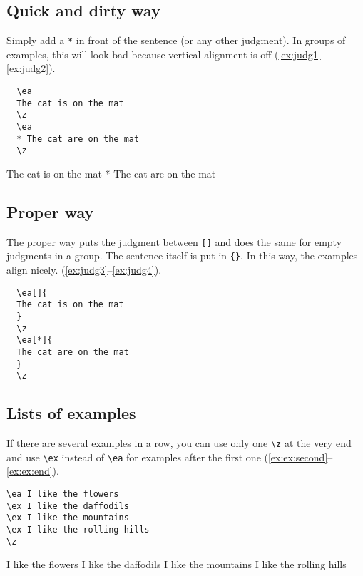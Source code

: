 \documentclass[output=paper]{langscibook}
\newcommand{\cmd}[1]{\texttt{\textbackslash#1}}
\begin{document}
\subsection{Quick and dirty way}  
Simply add a \texttt{*} in front of the sentence (or any other judgment). In groups of examples, this will look bad because vertical alignment is off (\ref{ex:judg1}--\ref{ex:judg2}).

\begin{minipage}{.45\textwidth}
\begin{lstlisting}
  \ea 
  The cat is on the mat
  \z
  \ea 
  * The cat are on the mat
  \z
\end{lstlisting}
\end{minipage}
\parbox[b]{.45\textwidth}{
  \ea\label{ex:judg1} 
  The cat is on the mat
  \z
  \ea\label{ex:judg2} 
  * The cat are on the mat
  \z
  }
  
\subsection{Proper way}  
The proper way puts the judgment between \texttt{[]} and does the same for empty judgments in a group. The sentence itself is put in \texttt{\{\}}. In this way, the examples align nicely. (\ref{ex:judg3}--\ref{ex:judg4}).
  
\begin{minipage}{.45\textwidth}
\begin{lstlisting}
  \ea[]{ 
  The cat is on the mat
  }
  \z 
  \ea[*]{ 
  The cat are on the mat
  }
  \z
\end{lstlisting}
\end{minipage}
\parbox[b]{.45\textwidth}{
  \z 
  \z
  }
  
 
\subsection{Lists of examples}
If there are several examples in a row, you can use only one \cmd{z} at the very end and use \cmd{ex} instead of \cmd{ea} for examples after the first one (\ref{ex:ex:second}--\ref{ex:ex:end}).

\begin{minipage}{.45\textwidth}
\begin{lstlisting}
\ea I like the flowers
\ex I like the daffodils
\ex I like the mountains
\ex I like the rolling hills
\z
\end{lstlisting}
\end{minipage}
\parbox{.45\textwidth}{
\ea I like the flowers\label{ex:ex:start}
\ex I like the daffodils\label{ex:ex:second}
\ex I like the mountains
\ex I like the rolling hills\label{ex:ex:end}
\z
}
\end{document}
